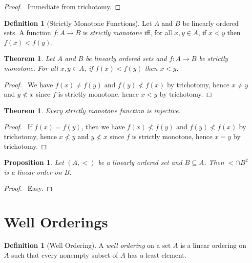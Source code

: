 \documentclass{article}
\let\qed\relax
\newtheorem{proposition}[axiom]{Proposition}
\newtheorem{theorem}[axiom]{Theorem}
\theoremstyle{definition}
\newtheorem{definition}[axiom]{Definition}
\begin{document}
    \begin{proof}
        \pf\ Immediate from trichotomy. \qed
    \end{proof}

    \begin{definition}[Strictly Monotone Functions]
        Let $A$ and $B$ be linearly ordered sets. A function $f : A \rightarrow B$ is \emph{strictly
        monotone} iff, for all $x, y \in A$, if $x < y$ then $f(x) < f(y)$.
    \end{definition}

    \begin{theorem}
        Let $A$ and $B$ be linearly ordered sets and $f : A \rightarrow B$ be strictly monotone.
        For all $x, y \in A$, if $f(x) < f(y)$ then $x < y$.
    \end{theorem}

    \begin{proof}
        \pf\ We have $f(x) \neq f(y)$ and $f(y) \not < f(x)$ by trichotomy, hence $x \neq y$ and $y \not < x$
        since $f$ is strictly monotone, hence $x < y$ by trichotomy. \qed
    \end{proof}

    \begin{theorem}
        Every strictly monotone function is injective.
    \end{theorem}

    \begin{proof}
        \pf\ If $f(x) = f(y)$, then we have $f(x) \not < f(y)$ and $f(y) \not < f(x)$ by trichotomy,
        hence $x \not < y$ and $y \not < x$ since $f$ is strictly monotone, hence $x = y$ by
        trichotomy. \qed
    \end{proof}

    \begin{proposition}
        Let $(A, <)$ be a linearly ordered set and $B \subseteq A$. Then $< \cap B^2$ is a linear order on $B$.
    \end{proposition}

    \begin{proof}
        \pf\ Easy. \qed
    \end{proof}
    
    \section{Well Orderings}

    \begin{definition}[Well Ordering]
        A \emph{well ordering} on a set $A$ is a linear ordering on $A$ such that every nonempty subset of
        $A$ has a least element.
    \end{definition}
\end{document}
